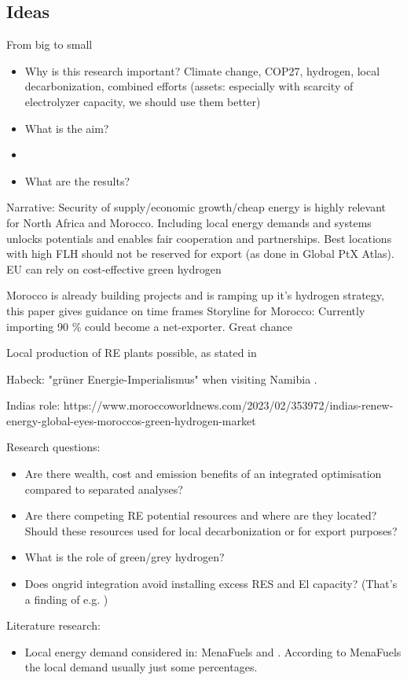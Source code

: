 
\subsection{Ideas}
From big to small
\begin{itemize}
    \item Why is this research important? Climate change, COP27, hydrogen, local decarbonization, combined efforts (assets: especially with scarcity of electrolyzer capacity, we should use them better)
    \item What is the aim?
    \item 
    \item What are the results?
\end{itemize}
Narrative: 
Security of supply/economic growth/cheap energy is highly relevant for North Africa and Morocco. 
Including local energy demands and systems unlocks potentials and enables fair cooperation and partnerships.
Best locations with high FLH should not be reserved for export (as done in Global PtX Atlas). 
EU can rely on cost-effective green hydrogen

Morocco is already building projects and is ramping up it's hydrogen strategy, this paper gives guidance on time frames
Storyline for Morocco: Currently importing 90 \% could become a net-exporter. Great chance

Local production of RE plants possible, as stated in \cite{Ersoy2022}

Habeck: "gr{\"u}ner Energie-Imperialismus" when visiting Namibia \cite{HabeckEnergieimperialismus}.

Indias role: https://www.moroccoworldnews.com/2023/02/353972/indias-renew-energy-global-eyes-moroccos-green-hydrogen-market


Research questions:
\begin{itemize}
    \item Are there wealth, cost and emission benefits of an integrated optimisation compared to separated analyses?
    \item Are there competing RE potential resources and where are they located? Should these resources used for local decarbonization or for export purposes?
    \item What is the role of green/grey hydrogen?   
    \item Does ongrid integration avoid installing excess RES and El capacity? (That's a finding of e.g. \cite{Ruhnau2022})
\end{itemize}

Literature research:
\begin{itemize}
    \item Local energy demand considered in: MenaFuels and \cite{Hampp2021}. According to MenaFuels the local demand usually just some percentages.
\end{itemize}


